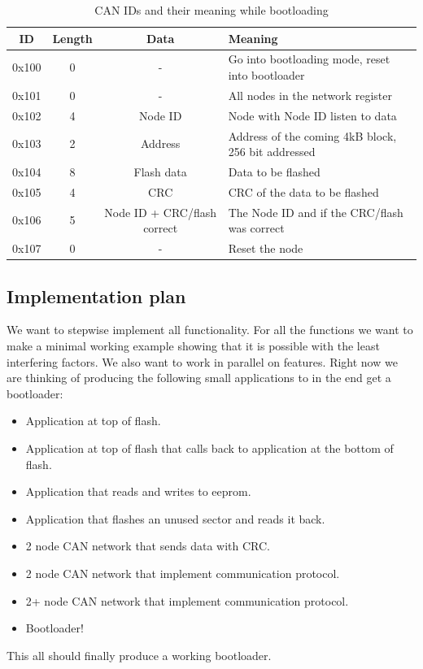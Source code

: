 \documentclass[twocolumn]{article}
\begin{document}
			\begin{table}[bthp]
				\caption{CAN IDs and their meaning while bootloading}
			
				\centering
				\begin{tabular}{|c|c|c|l|}
					\hline
					\textbf{ID} & \textbf{Length} & \textbf{Data} & \textbf{Meaning} \\ \hline
					0x100       & 0               & -                           & Go into bootloading mode, reset into bootloader \\ \hline
					0x101       & 0               & -                           & All nodes in the network register \\ \hline
					0x102       & 4               & Node ID                     & Node with Node ID listen to data \\ \hline
					0x103       & 2               & Address                     & Address of the coming 4kB block, 256 bit addressed \\ \hline
					0x104       & 8               & Flash data                  & Data to be flashed \\ \hline
					0x105       & 4               & CRC                         & CRC of the data to be flashed \\ \hline
					0x106       & 5               & Node ID + CRC/flash correct & The Node ID and if the CRC/flash was correct \\ \hline
					0x107       & 0               & -                           & Reset the node \\ \hline
				\end{tabular}
			\end{table}
	
	\subsection*{Implementation plan}
		We want to stepwise implement all functionality.
		For all the functions we want to make a minimal working example showing that it is possible with the least interfering factors.
		We also want to work in parallel on features.
		Right now we are thinking of producing the following small applications to in the end get a bootloader:
		\begin{itemize}
			\item Application at top of flash.
			\item Application at top of flash that calls back to application at the bottom of flash.
			\item Application that reads and writes to eeprom.
			\item Application that flashes an unused sector and reads it back.
			\item 2 node CAN network that sends data with CRC.
			\item 2 node CAN network that implement communication protocol.
			\item 2+ node CAN network that implement communication protocol.
			\item Bootloader!
		\end{itemize}
		
		This all should finally produce a working bootloader. 
\end{document}

